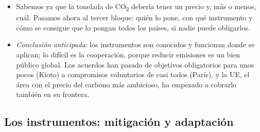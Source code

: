 \documentclass[11pt]{article}
\begin{document}
\begin{itemize}
\item Sabemos ya que la tonelada de CO\textsubscript{2} debería tener un precio y, más o menos, cuál. Pasamos ahora al tercer bloque: quién lo pone, con qué instrumento y cómo se consigue que lo pongan todos los países, si nadie puede obligarlos.
\item \emph{Conclusión anticipada}: los instrumentos son conocidos y funcionan donde se aplican; lo difícil es la cooperación, porque reducir emisiones es un bien público global. Los acuerdos han pasado de objetivos obligatorios para unos pocos (Kioto) a compromisos voluntarios de casi todos (París), y la UE, el área con el precio del carbono más ambicioso, ha empezado a cobrarlo también en su frontera.
\end{itemize}

\subsection{Los instrumentos: mitigación y adaptación}\label{sec:instrumentos}
\end{document}
